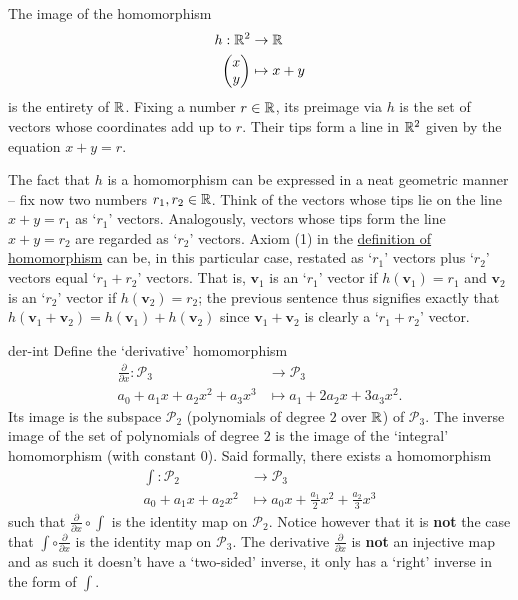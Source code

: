\begin{example}{}{}
 The image of the homomorphism
 \begin{align*}
  h: \mathbb{R}^2 &\to \mathbb{R}\\
  \begin{pmatrix}
   x\\
   y
  \end{pmatrix}
          & \mapsto 
          x + y
 \end{align*}
 is the entirety of $\mathbb{R}$. Fixing a number $r \in \mathbb{R}$, its preimage via $h$ is
 the set of vectors whose coordinates add up to $r$. Their tips form a line in
 $\mathbb{R}^2$ given by the equation $x + y = r$.

 The fact that $h$ is a homomorphism can be expressed in a neat geometric manner
 -- fix now two numbers $r_1,r_2 \in \mathbb{R}$. Think of the vectors whose tips lie on
 the line $x + y = r_1$ as `$r_1$' vectors. Analogously, vectors whose tips form
 the line $x + y = r_2$ are regarded as `$r_2$' vectors. Axiom (1) in the
 \hyperref[def:homomorphism]{definition of homomorphism} can be, in this
 particular case, restated as `$r_1$' vectors plus `$r_2$' vectors equal `$r_1 +
 r_2$' vectors. That is, $\mathbf{v}_1$ is an `$r_1$' vector if $h(\mathbf{v}_1)
 = r_1$ and $\mathbf{v}_2$ is an `$r_2$' vector if $h(\mathbf{v}_2) = r_2$; the
 previous sentence thus signifies exactly that $h(\mathbf{v}_1 + \mathbf{v}_2) =
 h(\mathbf{v}_1) + h(\mathbf{v}_2)$ since $\mathbf{v}_1 + \mathbf{v}_2$ is
 clearly a `$r_1 + r_2$' vector.
 \begin{center}
 \end{center}
\end{example}

\begin{example}{}{der-int}
 Define the `derivative' homomorphism
 \begin{align*}
  \frac{\partial }{\partial x}: \mathcal{P}_3 &\to \mathcal{P}_3\\
  a_0 + a_1x + a_2x^2 + a_3x^3 & \mapsto a_1 + 2a_2x + 3a_3x^2.
 \end{align*}
 Its image is the subspace $\mathcal{P}_2$ (polynomials of degree $2$ over $\mathbb{R}$)
 of $\mathcal{P}_3$. The inverse image of the set of polynomials of degree $2$
 is the image of the `integral' homomorphism (with constant $0$). Said formally,
 there exists a homomorphism
 \begin{align*}
  \int: \mathcal{P}_2 & \to \mathcal{P}_3\\
  a_0 + a_1x + a_2x^2 & \mapsto a_0x + \frac{a_1}{2}x^2 + \frac{a_2}{3}x^3
 \end{align*}
 such that $\frac{\partial }{\partial x} \circ \int $ is the identity map on
 $\mathcal{P}_2$. Notice however that it is \textbf{not} the case that $\int
 \circ \frac{\partial }{\partial x}$ is the identity map on $\mathcal{P}_3$. The
 derivative $\frac{\partial }{\partial x}$ is \textbf{not} an injective map and
 as such it doesn't have a `two-sided' inverse, it only has a `right' inverse in
 the form of $\int $.
\end{example}

